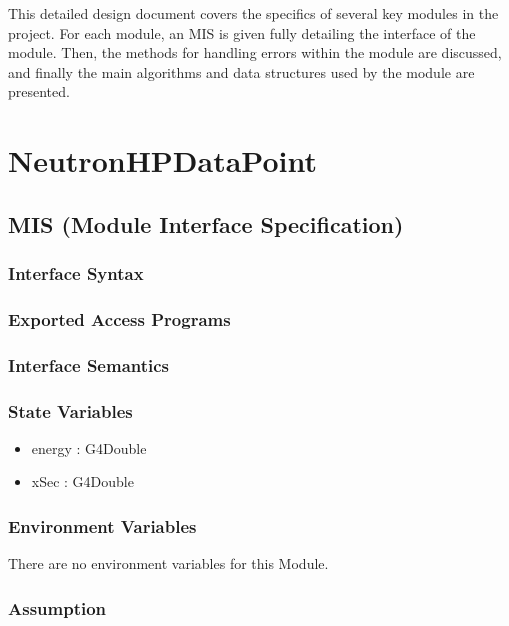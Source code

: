 \documentclass[12pt]{article}
\begin{document}
This detailed design document covers the specifics of several key modules in the project. For each module, an MIS is given fully detailing the interface of the module. Then, the methods for handling errors within the module are discussed, and finally the main algorithms and data structures used by the module are presented.


\section{NeutronHPDataPoint}

\subsection{MIS (Module Interface Specification)}
\subsubsection{Interface Syntax}%

\subsubsection{Exported Access Programs}%

\subsubsection{Interface Semantics}

\subsubsection{State Variables}%
\begin{itemize}
\item energy : G4Double
\item xSec : G4Double
\end{itemize}

\subsubsection{Environment Variables}%
There are no environment variables for this Module.

\subsubsection{Assumption}%
\end{document}

